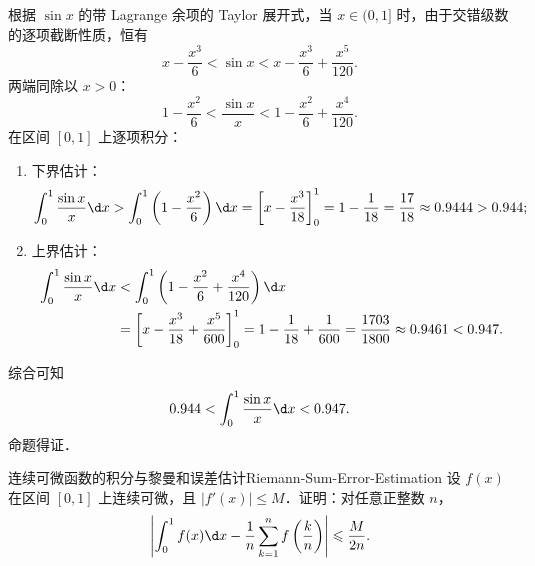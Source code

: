 \begin{myproof}
    根据 $\sin x$ 的带 Lagrange 余项的 Taylor 展开式，当 $x \in (0, 1]$ 时，由于交错级数的逐项截断性质，恒有
    \begin{equation}
        x - \frac{x^3}{6} < \sin x < x - \frac{x^3}{6} + \frac{x^5}{120}.
    \end{equation}
    两端同除以 $x > 0$：
    \begin{equation}
        1 - \frac{x^2}{6} < \frac{\sin x}{x} < 1 - \frac{x^2}{6} + \frac{x^4}{120}.
    \end{equation}
    在区间 $[0, 1]$ 上逐项积分：
    \begin{enumerate}
        \item 下界估计：
              \begin{equation}
                  \int_0^1 \frac{\sin x}{x}\d x > \int_0^1 \left(1 - \frac{x^2}{6}\right)\d x = \left[ x - \frac{x^3}{18} \right]_0^1 = 1 - \frac{1}{18} = \frac{17}{18} \approx 0.9444 > 0.944;
              \end{equation}
        \item 上界估计：
              \begin{equation}
                  \begin{aligned}
                      \int_0^1 \frac{\sin x}{x}\d x & < \int_0^1 \left(1 - \frac{x^2}{6} + \frac{x^4}{120}\right)\d x                                                                          \\
                                                    & = \left[ x - \frac{x^3}{18} + \frac{x^5}{600} \right]_0^1 = 1 - \frac{1}{18} + \frac{1}{600} = \frac{1703}{1800} \approx 0.9461 < 0.947.
                  \end{aligned}
              \end{equation}
    \end{enumerate}
    综合可知
    \begin{equation}
        0.944 < \int_0^1 \frac{\sin x}{x} \d x < 0.947.
    \end{equation}
    命题得证．
\end{myproof}

\begin{problem}{连续可微函数的积分与黎曼和误差估计}{Riemann-Sum-Error-Estimation}
    设 $f(x)$ 在区间 $[0, 1]$ 上连续可微，且 $|f'(x)| \leqslant M$．证明：对任意正整数 $n$，
    \begin{equation}
        \left| \int_0^1 f(x) \d x - \frac{1}{n}\sum_{k=1}^n f\left(\frac{k}{n}\right) \right| \leqslant \frac{M}{2n}.
    \end{equation}
\end{problem}

